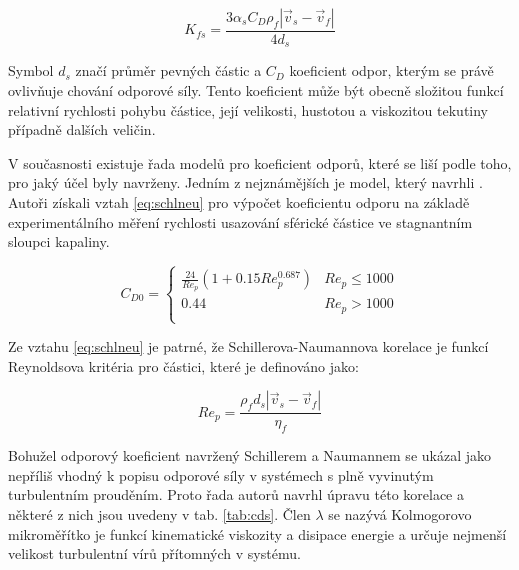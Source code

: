 \begin{equation}
	K_{fs}= \frac{3\alpha_{s}C_{D}\rho_{f}|\vec{v}_{s} - \vec{v}_{f}|}{4d_{s}}
	\label{eq:kfs}
\end{equation}
  
\noindent Symbol $d_{s}$ značí průměr pevných částic a $C_{D}$ koeficient odpor, kterým se právě ovlivňuje chování odporové síly. Tento koeficient může být obecně složitou funkcí relativní rychlosti pohybu částice, její velikosti, hustotou a viskozitou tekutiny případně dalších veličin.   

V současnosti existuje řada modelů pro koeficient odporů, které se liší podle toho, pro jaký účel byly navrženy. Jedním z nejznámějších je model, který navrhli \citet{schi32}. Autoři získali vztah \ref{eq:schlneu} pro výpočet koeficientu odporu na základě experimentálního měření rychlosti usazování sférické částice ve stagnantním sloupci kapaliny.    
 
	\hypertarget{hyp:schlneu}{} 
\begin{equation}
	\label{eq:schlneu}
  C_{D0} = \left\{ \begin{array}{ll}
  \frac{24}{Re_{p}}  \left( 1 + \num{0.15}Re_{p}^{\num{0.687}} \right) & Re_{p} \le 1000\\
  \num{0.44} & Re_{p} > 1000\\
  \end{array} \right.
\end{equation}

\noindent Ze vztahu \ref{eq:schlneu} je patrné, že Schillerova-Naumannova korelace je funkcí Reynoldsova kritéria pro částici, které je definováno jako:

\begin{equation}
	Re_{p}= \frac{\rho_{f}d_{s}|\vec{v}_{s} - \vec{v}_{f}|}{\eta_{f}}
	\label{eq:reyp}
\end{equation}

Bohužel odporový koeficient navržený Schillerem a Naumannem se ukázal jako nepříliš vhodný k popisu odporové síly v systémech s plně vyvinutým turbulentním prouděním. Proto řada autorů navrhl úpravu této korelace a některé z nich jsou uvedeny v tab. \ref{tab:cds}. Člen $\lambda$ se nazývá Kolmogorovo mikroměřítko je funkcí kinematické viskozity a disipace energie a určuje nejmenší velikost turbulentní vírů přítomných v systému. 


